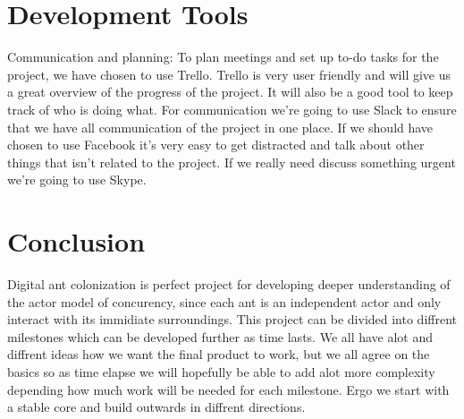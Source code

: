 \documentclass[a4paper]{article}
\begin{document}
\section{Development Tools}
Communication and planning: To plan meetings and set up to-do tasks for the
project, we have chosen to use Trello. Trello is very user friendly and will
give us a great overview of the progress of the project. It will also be a good
tool to keep track of who is doing what. For communication we’re going to use
Slack to ensure that we have all communication of the project in one place. If
we should have chosen to use Facebook it’s very easy to get distracted and talk
about other things that isn’t related to the project. If we really need discuss
something urgent we’re going to use Skype.

\section{Conclusion}
Digital ant colonization is perfect project for developing deeper understanding
of the actor model of concurency, since each ant is an independent actor and
only interact with its immidiate surroundings. This project can be divided into
diffrent milestones which can be developed further as time lasts. We all have
alot and diffrent ideas how we want the final product to work, but we all agree
on the basics so as time elapse we will hopefully be able to add alot more
complexity depending how much work will be needed for each milestone. Ergo we
start with a stable core and build outwards in diffrent directions.
\end{document}
